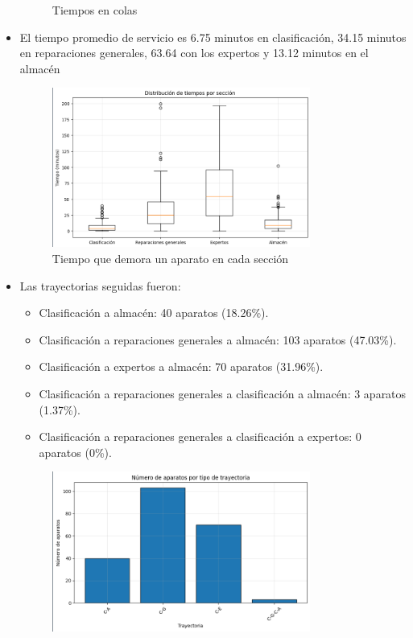 \documentclass[12pt]{article}
\begin{document}
\begin{itemize}
\begin{figure}[H]
\begin{minipage}{0.45\textwidth}
            \caption{Tiempos en colas}
            \label{fig: Tiempo en cada cola}
        \end{minipage}
    \end{figure}
    \item El tiempo promedio de servicio es 6.75 minutos en clasificación, 34.15 minutos en reparaciones generales, 63.64 con los expertos y 13.12 minutos en el almacén
    \begin{figure}[H]
        \centering
        \includegraphics[width=0.8\textwidth]{section_times.png}
        \caption{Tiempo que demora un aparato en cada sección}
        \label{fig: Tiempo que demora un aparato en cada sección}
    \end{figure}
    \item Las trayectorias seguidas fueron:
    \begin{itemize}
        \item Clasificación a almacén: 40 aparatos (18.26\%).
        \item Clasificación a reparaciones generales a almacén: 103 aparatos (47.03\%).
        \item Clasificación a expertos a almacén: 70 aparatos (31.96\%).
        \item Clasificación a reparaciones generales a clasificación a almacén: 3 aparatos (1.37\%).
        \item Clasificación a reparaciones generales a clasificación a expertos: 0 aparatos (0\%).
    \end{itemize}
    \begin{figure}[H]
        \centering
        \includegraphics[width=0.8\textwidth]{trajectories.png}

\end{figure}
\end{itemize}
\end{document}

